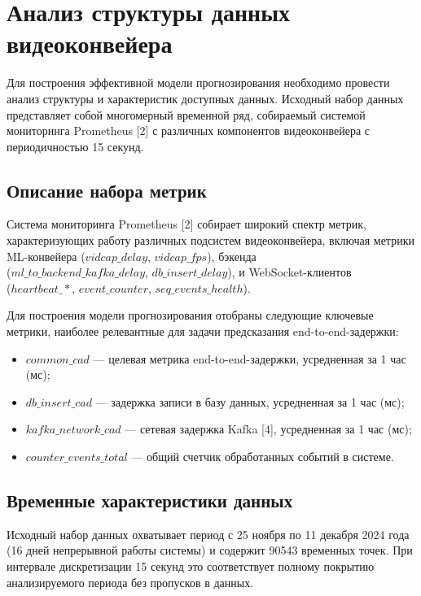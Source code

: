 \section{Анализ структуры данных видеоконвейера}

Для построения эффективной модели прогнозирования необходимо провести анализ структуры и характеристик доступных данных. Исходный набор данных представляет собой многомерный временной ряд, собираемый системой мониторинга Prometheus [2] с различных компонентов видеоконвейера с периодичностью 15 секунд.

\subsection{Описание набора метрик}

Система мониторинга Prometheus [2] собирает широкий спектр метрик, характеризующих работу различных подсистем видеоконвейера, включая метрики ML-конвейера ($vidcap\_delay$, $vidcap\_fps$), бэкенда \\
($ml\_to\_backend\_kafka\_delay$, $db\_insert\_delay$), и WebSocket-клиентов \\
($heartbeat\_*$, $event\_counter$, $seq\_events\_health$).

Для построения модели прогнозирования отобраны следующие ключевые метрики, наиболее релевантные для задачи предсказания end-to-end-задержки:

\begin{itemize}
	\item $common\_cad$ --- целевая метрика end-to-end-задержки, усредненная за 1 час (мс);
	\item $db\_insert\_cad$ --- задержка записи в базу данных, усредненная за 1 час (мс);
	\item $kafka\_network\_cad$ --- сетевая задержка Kafka [4], усредненная за 1 час (мс);
	\item $counter\_events\_total$ --- общий счетчик обработанных событий в системе.
\end{itemize}

\subsection{Временные характеристики данных}

Исходный набор данных охватывает период с 25 ноября по 11 декабря 2024 года (16 дней непрерывной работы системы) и содержит 90543 временных точек. При интервале дискретизации 15 секунд это соответствует полному покрытию анализируемого периода без пропусков в данных.

